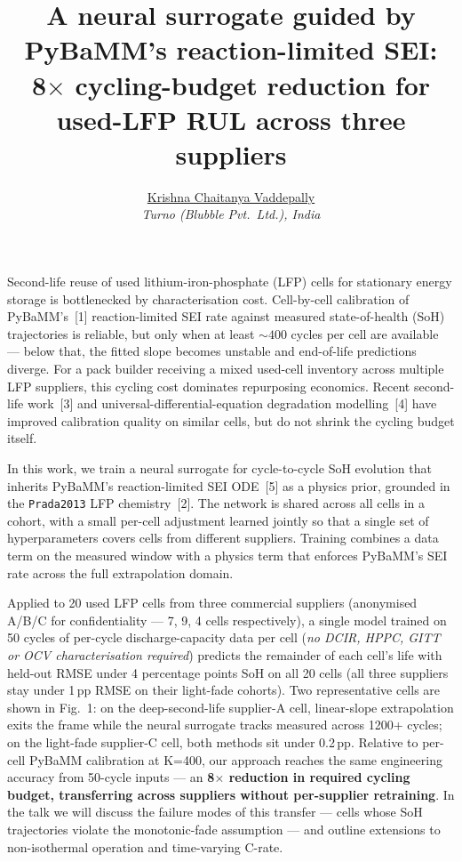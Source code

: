 \documentclass[12pt,a4paper]{article}
\title{\vspace{-1.0cm}\textbf{\normalsize A neural surrogate guided by
PyBaMM's reaction-limited SEI:\\ 8$\times$ cycling-budget reduction for
used-LFP RUL across three suppliers}}
\author{\normalsize \underline{Krishna Chaitanya Vaddepally}\\[-0.3em]
  \small \emph{Turno (Blubble Pvt.\ Ltd.), India}}
\date{}
\begin{document}
\maketitle
\thispagestyle{empty}

\vspace{-3.6em}
Second-life reuse of used lithium-iron-phosphate (LFP) cells for
stationary energy storage is bottlenecked by characterisation cost.
Cell-by-cell calibration of PyBaMM's~[1] reaction-limited SEI rate
against measured state-of-health (SoH) trajectories is reliable, but
only when at least ${\sim}400$ cycles per cell are available --- below
that, the fitted slope becomes unstable and end-of-life predictions
diverge. For a pack builder receiving a mixed used-cell inventory
across multiple LFP suppliers, this cycling cost dominates repurposing
economics. Recent second-life work~[3] and universal-differential-equation
degradation modelling~[4] have improved calibration quality on similar
cells, but do not shrink the cycling budget itself.

In this work, we train a neural surrogate for cycle-to-cycle SoH
evolution that inherits PyBaMM's reaction-limited SEI ODE~[5] as a
physics prior, grounded in the \texttt{Prada2013} LFP chemistry~[2].
The network is shared across all cells in a cohort, with a small
per-cell adjustment learned jointly so that a single set of
hyperparameters covers cells from different suppliers. Training
combines a data term on the measured window with a physics term that
enforces PyBaMM's SEI rate across the full extrapolation domain.

Applied to 20 used LFP cells from three commercial suppliers
(anonymised A/B/C for confidentiality --- 7, 9, 4 cells respectively),
a single model trained on 50 cycles of per-cycle discharge-capacity
data per cell (\emph{no DCIR, HPPC, GITT or OCV characterisation
required}) predicts the remainder of each cell's life with held-out
RMSE under 4 percentage points SoH on all 20 cells (all three
suppliers stay under 1\,pp RMSE on their light-fade cohorts). Two representative cells are shown
in Fig.~1: on the deep-second-life supplier-A cell, linear-slope
extrapolation exits the frame while the neural surrogate tracks
measured across 1200+ cycles; on the light-fade supplier-C cell, both
methods sit under 0.2\,pp. Relative to per-cell PyBaMM calibration at
K=400, our approach reaches the same engineering accuracy from
50-cycle inputs --- an \textbf{8$\times$ reduction in required cycling
budget, transferring across suppliers without per-supplier
retraining}. In the talk we will discuss the failure modes of this
transfer --- cells whose SoH trajectories violate the monotonic-fade
assumption --- and outline extensions to non-isothermal operation and
time-varying C-rate.
\end{document}
